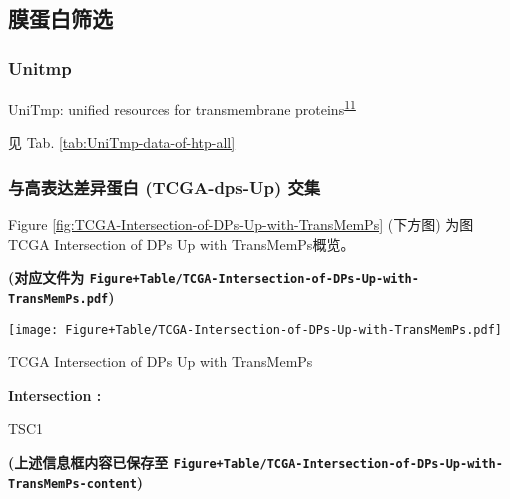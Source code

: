 \documentclass[
]{article}
\begin{document}
\hypertarget{ux819cux86cbux767dux7b5bux9009-1}{%
\subsection{膜蛋白筛选}\label{ux819cux86cbux767dux7b5bux9009-1}}

\hypertarget{unitmp-1}{%
\subsubsection{Unitmp}\label{unitmp-1}}

UniTmp: unified resources for transmembrane proteins\textsuperscript{\protect\hyperlink{ref-UnitmpUnifiedDobson2024}{11}}

见 Tab. \ref{tab:UniTmp-data-of-htp-all}

\hypertarget{ux4e0eux9ad8ux8868ux8fbeux5deeux5f02ux86cbux767d-tcga-dps-up-ux4ea4ux96c6}{%
\subsubsection{与高表达差异蛋白 (TCGA-dps-Up) 交集}\label{ux4e0eux9ad8ux8868ux8fbeux5deeux5f02ux86cbux767d-tcga-dps-up-ux4ea4ux96c6}}

Figure \ref{fig:TCGA-Intersection-of-DPs-Up-with-TransMemPs} (下方图) 为图TCGA Intersection of DPs Up with TransMemPs概览。

\textbf{(对应文件为 \texttt{Figure+Table/TCGA-Intersection-of-DPs-Up-with-TransMemPs.pdf})}

\def\@captype{figure}
\begin{center}
\texttt{[image: Figure+Table/TCGA-Intersection-of-DPs-Up-with-TransMemPs.pdf]}
\caption{TCGA Intersection of DPs Up with TransMemPs}\label{fig:TCGA-Intersection-of-DPs-Up-with-TransMemPs}
\end{center}
\begin{center}\begin{tcolorbox}[colback=gray!10, colframe=gray!50, width=0.9\linewidth, arc=1mm, boxrule=0.5pt]
\textbf{
Intersection
:}

\vspace{0.5em}

    TSC1

\vspace{2em}
\end{tcolorbox}
\end{center}

\textbf{(上述信息框内容已保存至 \texttt{Figure+Table/TCGA-Intersection-of-DPs-Up-with-TransMemPs-content})}
\end{document}
